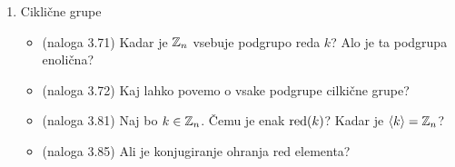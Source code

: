 \begin{enumerate}
    \item Ciklične grupe
    \begin{itemize}
        \item (naloga 3.71) Kadar je $\mathbb{Z}_n$ vsebuje podgrupo reda $k$? Alo je ta podgrupa enolična?
        \item (naloga 3.72) Kaj lahko povemo o vsake podgrupe cilkične grupe?
        \item (naloga 3.81) Naj bo $k \in \mathbb{Z}_n$. Čemu je enak $\operatorname{red} (k)$? Kadar je $\left\langle k \right\rangle  = \mathbb{Z}_n$?
        \item (naloga 3.85) Ali je konjugiranje ohranja red elementa?
    \end{itemize}
\end{enumerate}
